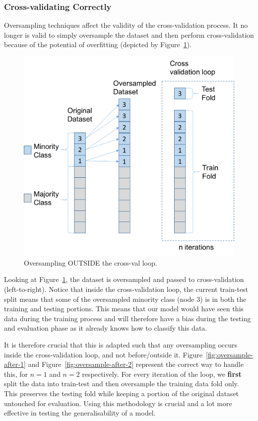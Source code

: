 \documentclass[12pt,a4paper,twoside]{report}
\begin{document}
\subsubsection{Cross-validating Correctly}
Oversampling techniques affect the validity of the cross-validation process. It no longer is valid to simply oversample the dataset and then perform cross-validation because of the potential of overfitting (depicted by Figure~\ref{fig:oversample-before}).

\begin{figure}[!htbp]
\centering
\includegraphics[scale=0.8]{oversample-before}
\caption{Oversampling OUTSIDE the cross-val loop.}
\label{fig:oversample-before}
\end{figure}

Looking at Figure~\ref{fig:oversample-before}, the dataset is oversampled and passed to cross-validation (left-to-right). Notice that inside the cross-validation loop, the current train-test split means that some of the oversampled minority class (node 3) is in both the training and testing portions. This means that our model would have seen this data during the training process and will therefore have a bias during the testing and evaluation phase as it already knows how to classify this data. 

It is therefore crucial that this is adapted such that any oversampling occurs inside the cross-validation loop, and not before/outside it. Figure~\ref{fig:oversample-after-1} and Figure~\ref{fig:oversample-after-2} represent the correct way to handle this, for $n=1$ and $n=2$ respectively. For every iteration of the loop, we \textbf{first} split the data into train-test and then oversample the training data fold only. This preserves the testing fold while keeping a portion of the original dataset untouched for evaluation. Using this methodology is crucial and a lot more effective in testing the generalisability of a model.
\end{document}
